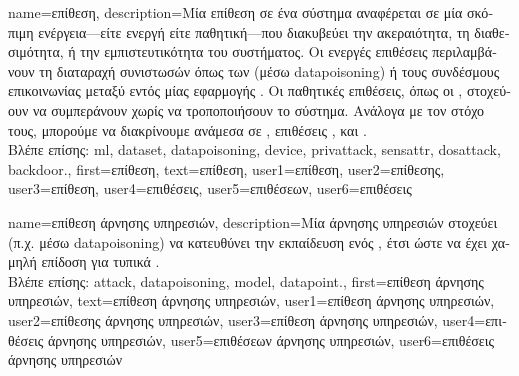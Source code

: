 {name={\foreignlanguage{greek}{επίθεση}},
	description={\foreignlanguage{greek}{Μία επίθεση σε ένα σύστημα}  
		\foreignlanguage{greek}{αναφέρεται σε μία σκόπιμη ενέργεια—είτε ενεργή είτε παθητική—που διακυβεύει την ακεραιότητα,
		τη διαθεσιμότητα, ή την εμπιστευτικότητα του συστήματος. Οι ενεργές επιθέσεις περιλαμβάνουν τη διαταραχή 
		συνιστωσών όπως των}  (\foreignlanguage{greek}{μέσω} \gls{datapoisoning}) 
		\foreignlanguage{greek}{ή τους συνδέσμους επικοινωνίας μεταξύ}  \foreignlanguage{greek}{εντός μίας 
		εφαρμογής} . \foreignlanguage{greek}{Οι παθητικές επιθέσεις, όπως οι} , 
		\foreignlanguage{greek}{στοχεύουν να συμπεράνουν}  \foreignlanguage{greek}{χωρίς να τροποποιήσουν 
		το σύστημα. Ανάλογα με τον στόχο τους, μπορούμε να διακρίνουμε ανάμεσα σε} , 
		\foreignlanguage{greek}{επιθέσεις} , \foreignlanguage{greek}{και} .\\
		\foreignlanguage{greek}{Βλέπε επίσης:} \gls{ml}, \gls{dataset}, \gls{datapoisoning}, \gls{device}, \gls{privattack}, 
		\gls{sensattr}, \gls{dosattack}, \gls{backdoor}.},
	first={\foreignlanguage{greek}{επίθεση}},
	text={\foreignlanguage{greek}{επίθεση}},
	user1={\foreignlanguage{greek}{επίθεση}}, %
  	user2={\foreignlanguage{greek}{επίθεσης}}, %
	user3={\foreignlanguage{greek}{επίθεση}}, %
  	user4={\foreignlanguage{greek}{επιθέσεις}}, %
	user5={\foreignlanguage{greek}{επιθέσεων}}, %
  	user6={\foreignlanguage{greek}{επιθέσεις}} %
}

{name={\foreignlanguage{greek}{επίθεση άρνησης υπηρεσιών}}, 
	description={\foreignlanguage{greek}{Μία} 
		 \foreignlanguage{greek}{άρνησης υπηρεσιών στοχεύει (π.χ. μέσω} \gls{datapoisoning}) 
		\foreignlanguage{greek}{να κατευθύνει την εκπαίδευση ενός} , 
		\foreignlanguage{greek}{έτσι ώστε να έχει χαμηλή επίδοση για τυπικά} .\\
		\foreignlanguage{greek}{Βλέπε επίσης:} \gls{attack}, \gls{datapoisoning}, \gls{model}, \gls{datapoint}.},
	first={\foreignlanguage{greek}{επίθεση άρνησης υπηρεσιών}},
	text={\foreignlanguage{greek}{επίθεση άρνησης υπηρεσιών}},
	user1={\foreignlanguage{greek}{επίθεση άρνησης υπηρεσιών}}, %
  	user2={\foreignlanguage{greek}{επίθεσης άρνησης υπηρεσιών}}, %
	user3={\foreignlanguage{greek}{επίθεση άρνησης υπηρεσιών}}, %
  	user4={\foreignlanguage{greek}{επιθέσεις άρνησης υπηρεσιών}}, %
	user5={\foreignlanguage{greek}{επιθέσεων άρνησης υπηρεσιών}}, %
  	user6={\foreignlanguage{greek}{επιθέσεις άρνησης υπηρεσιών}} %
}

